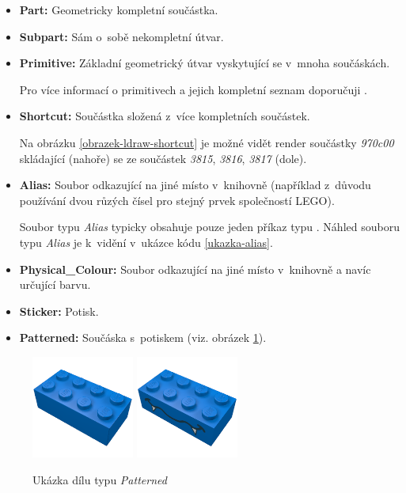    \begin{itemize}
        \item \textbf{Part:} Geometricky kompletní součástka.
        \item \textbf{Subpart:} Sám o~sobě nekompletní útvar.
        \item \textbf{Primitive:} Základní geometrický útvar vyskytující se v~mnoha součáskách.

        Pro více informací o primitivech a jejich kompletní seznam doporučuji \autocite{ldraw:primitives}.

        \item \textbf{Shortcut:} Součástka složená z~více kompletních součástek.

        Na obrázku \ref{obrazek-ldraw-shortcut} je možné vidět render součástky \textit{970c00} skládající (nahoře) se ze součástek \textit{3815}, \textit{3816}, \textit{3817} (dole).

        \item \textbf{Alias:} Soubor odkazující na jiné místo v~knihovně (například z~důvodu používání dvou růzých čísel pro stejný prvek společností LEGO). 
        
        Soubor typu \textit{Alias} typicky obsahuje pouze jeden příkaz typu . Náhled souboru typu \textit{Alias} je k~vidění v~ukázce kódu \ref{ukazka-alias}.

        \item \textbf{Physical\_Colour:} Soubor odkazující na jiné místo v~knihovně a navíc určující barvu.
        \item \textbf{Sticker:} Potisk.
        \item \textbf{Patterned:} Součáska s~potiskem (viz. obrázek \ref{obrazek-ldraw-patterned}).
    \end{itemize}
   
    \begin{figure}[htbp]
        \centering
        \includegraphics[width=0.3\textwidth,height=\textheight,keepaspectratio]{images/3001.png}
        \includegraphics[width=0.3\textwidth,height=\textheight,keepaspectratio]{images/3001p0b.png}
        \caption{Ukázka dílu typu \textit{Patterned} \autocite{rebrickable:part:image:3001}\autocite{rebrickable:part:image:3001p0b}\label{obrazek-ldraw-patterned}}
    \end{figure}

